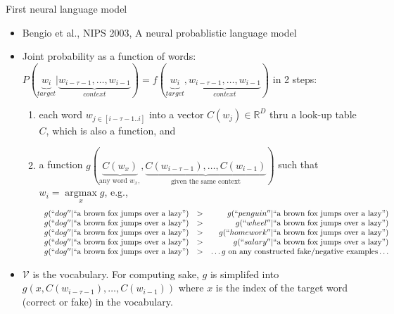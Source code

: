 \documentclass[10pt]{beamer}
\DeclareMathOperator*{\argmax}{argmax}
\begin{document}
\begin{frame}{First neural language model}
\begin{itemize}[<+->]
 \item Bengio et al., NIPS 2003, A neural probablistic language model 
 \item Joint probability as a function of words:  $P(\underbrace{w_i}_{target}|\underbrace{w_{i-\tau-1}, \dots,w_{i-1}}_{context}) = f(\underbrace{w_i}_{target}, \underbrace{w_{i-\tau-1}, \dots, w_{i-1}}_{context})$
in 2 steps: 
\begin{enumerate}
 \item each word $w_{j\in[i-\tau-1..i]}$ into a vector $C(w_j)\in \mathbb{R}^D$ thru a look-up table $C$, which is also a function, and 
 \item a function $g(\underbrace{C(w_x)}_{\text{any word }w_x,}, \underbrace{C(w_{i-\tau-1}), \dots, C(w_{i-1})}_{\text{given the same  context}})$ such that $w_i = \argmax\limits_x g$, %
 e.g., 
 {\tiny 
  $$
 \begin{array}{lcr}
   g(``dog''|\text{``a brown fox jumps over a lazy''}) & > & g(``penguin''|\text{``a brown fox jumps over a lazy''}) \\
   g(``dog''|\text{``a brown fox jumps over a lazy''}) & > & g(``wheel''|\text{``a brown fox jumps over a lazy''}) \\
   g(``dog''|\text{``a brown fox jumps over a lazy''}) & > & g(``homework''|\text{``a brown fox jumps over a lazy''}) \\
   g(``dog''|\text{``a brown fox jumps over a lazy''}) & > & g(``salary''|\text{``a brown fox jumps over a lazy''}) \\
   g(``dog''|\text{``a brown fox jumps over a lazy''}) & > & \dots g \text{ on any constructed  fake/negative examples} \dots 
 \end{array}
 $$
 }
\end{enumerate}
 
 \item $\mathcal{V}$ is the vocabulary. For computing sake, $g$ is simplifed into $g(x, C(w_{i-\tau-1}), \dots, C(w_{i-1}))$ where $x$ is the index of the target word (correct or fake) in the vocabulary. 
\end{itemize}
\end{frame}
\end{document}
